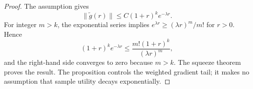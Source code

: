 \begin{proof}
The assumption gives
\[
  \lVert\widetilde g(r)\rVert
  \leq C(1+r)^k e^{-\lambda r}.
\]
For integer $m>k$, the exponential series implies
$e^{\lambda r}\geq (\lambda r)^m/m!$ for $r>0$. Hence
\[
  (1+r)^k e^{-\lambda r}
  \leq \frac{m!(1+r)^k}{(\lambda r)^m},
\]
and the right-hand side converges to zero because $m>k$. The squeeze theorem
proves the result. The proposition controls the weighted gradient tail; it
makes no assumption that sample utility decays exponentially.
\end{proof}

